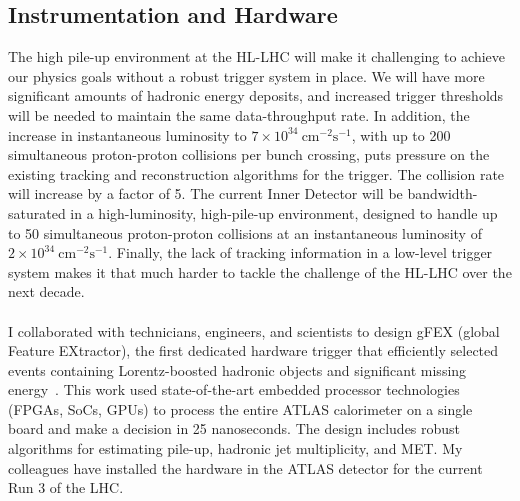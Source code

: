 \subsection{Instrumentation and Hardware} \label{ssec:instrumentation-and-hardware}
The high pile-up environment at the HL-LHC will make it challenging to achieve our physics goals without a robust trigger system in place. We will have more significant amounts of hadronic energy deposits, and increased trigger thresholds will be needed to maintain the same data-throughput rate. In addition, the increase in instantaneous luminosity to $7 \times 10^{34}\ \mathrm{cm}^{-2}\mathrm{s}^{-1}$, with up to 200 simultaneous proton-proton collisions per bunch crossing, puts pressure on the existing tracking and reconstruction algorithms for the trigger. The collision rate will increase by a factor of 5. The current Inner Detector will be bandwidth-saturated in a high-luminosity, high-pile-up environment, designed to handle up to 50 simultaneous proton-proton collisions at an instantaneous luminosity of $2 \times 10^{34}\ \mathrm{cm}^{-2}\mathrm{s}^{-1}$. Finally, the lack of tracking information in a low-level trigger system makes it that much harder to tackle the challenge of the HL-LHC over the next decade.
\\
\\
I collaborated with technicians, engineers, and scientists to design gFEX (global Feature EXtractor), the first dedicated hardware trigger that efficiently selected events containing Lorentz-boosted hadronic objects and significant missing energy~. %
This work used state-of-the-art embedded processor technologies (FPGAs, SoCs, GPUs) to process the entire ATLAS calorimeter on a single board and make a decision in 25 nanoseconds. The design includes robust algorithms for estimating pile-up, hadronic jet multiplicity, and MET. My colleagues have installed the hardware in the ATLAS detector for the current Run 3 of the LHC.
\\
\\

